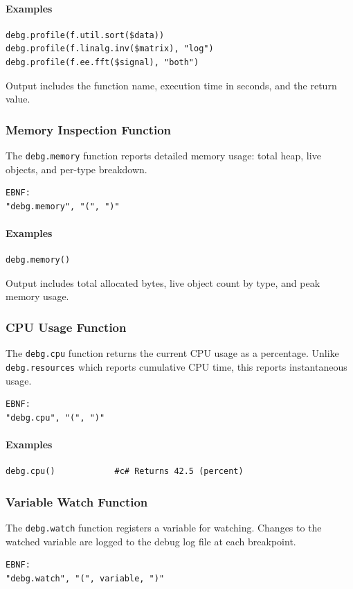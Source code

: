 \paragraph{Examples}
\begin{verbatim}
debg.profile(f.util.sort($data))
debg.profile(f.linalg.inv($matrix), "log")
debg.profile(f.ee.fft($signal), "both")
\end{verbatim}

Output includes the function name, execution time in seconds, and the return value.

\subsubsection{Memory Inspection Function}
The \texttt{debg.memory} function reports detailed memory usage: total heap, live objects, and per-type breakdown.
\begin{verbatim}
EBNF:
"debg.memory", "(", ")"
\end{verbatim}

\paragraph{Examples}
\begin{verbatim}
debg.memory()
\end{verbatim}

Output includes total allocated bytes, live object count by type, and peak memory usage.

\subsubsection{CPU Usage Function}
The \texttt{debg.cpu} function returns the current CPU usage as a percentage. Unlike \texttt{debg.resources} which reports cumulative CPU time, this reports instantaneous usage.
\begin{verbatim}
EBNF:
"debg.cpu", "(", ")"
\end{verbatim}

\paragraph{Examples}
\begin{verbatim}
debg.cpu()            #c# Returns 42.5 (percent)
\end{verbatim}

\subsubsection{Variable Watch Function}
The \texttt{debg.watch} function registers a variable for watching. Changes to the watched variable are logged to the debug log file at each breakpoint.
\begin{verbatim}
EBNF:
"debg.watch", "(", variable, ")"
\end{verbatim}

